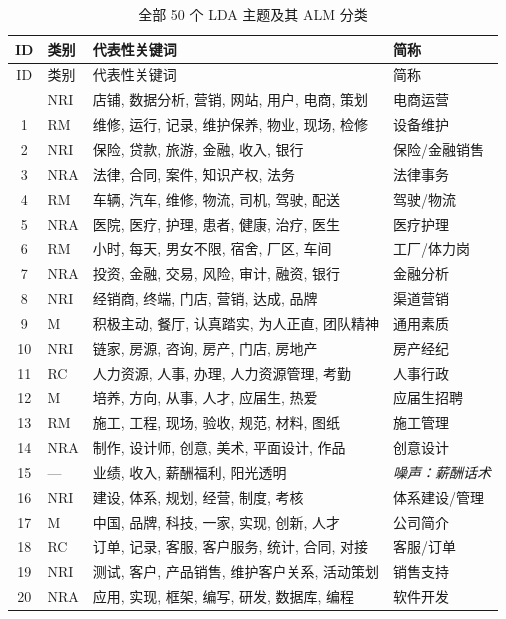 \documentclass[12pt, a4paper]{article}
\begin{document}
\begin{longtable}{clp{8.5cm}l}
\caption{全部 50 个 LDA 主题及其 ALM 分类}\label{tab:all_topics} \\
\toprule
ID & 类别 & 代表性关键词 & 简称 \\
\midrule
\endfirsthead
\toprule
ID & 类别 & 代表性关键词 & 简称 \\
\midrule
\endhead
\bottomrule
\endfoot
0  & NRI & 店铺, 数据分析, 营销, 网站, 用户, 电商, 策划 & 电商运营 \\
1  & RM  & 维修, 运行, 记录, 维护保养, 物业, 现场, 检修 & 设备维护 \\
2  & NRI & 保险, 贷款, 旅游, 金融, 收入, 银行 & 保险/金融销售 \\
3  & NRA & 法律, 合同, 案件, 知识产权, 法务 & 法律事务 \\
4  & RM  & 车辆, 汽车, 维修, 物流, 司机, 驾驶, 配送 & 驾驶/物流 \\
5  & NRA & 医院, 医疗, 护理, 患者, 健康, 治疗, 医生 & 医疗护理 \\
6  & RM  & 小时, 每天, 男女不限, 宿舍, 厂区, 车间 & 工厂/体力岗 \\
7  & NRA & 投资, 金融, 交易, 风险, 审计, 融资, 银行 & 金融分析 \\
8  & NRI & 经销商, 终端, 门店, 营销, 达成, 品牌 & 渠道营销 \\
9  & M   & 积极主动, 餐厅, 认真踏实, 为人正直, 团队精神 & 通用素质 \\
10 & NRI & 链家, 房源, 咨询, 房产, 门店, 房地产 & 房产经纪 \\
11 & RC  & 人力资源, 人事, 办理, 人力资源管理, 考勤 & 人事行政 \\
12 & M   & 培养, 方向, 从事, 人才, 应届生, 热爱 & 应届生招聘 \\
13 & RM  & 施工, 工程, 现场, 验收, 规范, 材料, 图纸 & 施工管理 \\
14 & NRA & 制作, 设计师, 创意, 美术, 平面设计, 作品 & 创意设计 \\
\rowcolor[gray]{0.9}
15 & --- & 业绩, 收入, 薪酬福利, 阳光透明 & \textit{噪声：薪酬话术} \\
16 & NRI & 建设, 体系, 规划, 经营, 制度, 考核 & 体系建设/管理 \\
17 & M   & 中国, 品牌, 科技, 一家, 实现, 创新, 人才 & 公司简介 \\
18 & RC  & 订单, 记录, 客服, 客户服务, 统计, 合同, 对接 & 客服/订单 \\
19 & NRI & 测试, 客户, 产品销售, 维护客户关系, 活动策划 & 销售支持 \\
20 & NRA & 应用, 实现, 框架, 编写, 研发, 数据库, 编程 & 软件开发 \\

\end{longtable}
\end{document}
